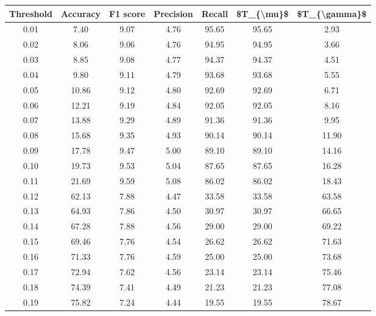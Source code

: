 \begin{tabular}{|c|c|c|c|c|c|c|}
\toprule
 Threshold &  Accuracy &  F1 score &  Precision &  Recall &  \$T\_\{\textbackslash mu\}\$ &  \$T\_\{\textbackslash gamma\}\$ \\
\hline
      0.01 &      7.40 &      9.07 &       4.76 &   95.65 &      95.65 &          2.93 \\
      0.02 &      8.06 &      9.06 &       4.76 &   94.95 &      94.95 &          3.66 \\
      0.03 &      8.85 &      9.08 &       4.77 &   94.37 &      94.37 &          4.51 \\
      0.04 &      9.80 &      9.11 &       4.79 &   93.68 &      93.68 &          5.55 \\
      0.05 &     10.86 &      9.12 &       4.80 &   92.69 &      92.69 &          6.71 \\
      0.06 &     12.21 &      9.19 &       4.84 &   92.05 &      92.05 &          8.16 \\
      0.07 &     13.88 &      9.29 &       4.89 &   91.36 &      91.36 &          9.95 \\
      0.08 &     15.68 &      9.35 &       4.93 &   90.14 &      90.14 &         11.90 \\
      0.09 &     17.78 &      9.47 &       5.00 &   89.10 &      89.10 &         14.16 \\
      0.10 &     19.73 &      9.53 &       5.04 &   87.65 &      87.65 &         16.28 \\
      0.11 &     21.69 &      9.59 &       5.08 &   86.02 &      86.02 &         18.43 \\
      0.12 &     62.13 &      7.88 &       4.47 &   33.58 &      33.58 &         63.58 \\
      0.13 &     64.93 &      7.86 &       4.50 &   30.97 &      30.97 &         66.65 \\
      0.14 &     67.28 &      7.88 &       4.56 &   29.00 &      29.00 &         69.22 \\
      0.15 &     69.46 &      7.76 &       4.54 &   26.62 &      26.62 &         71.63 \\
      0.16 &     71.33 &      7.76 &       4.59 &   25.00 &      25.00 &         73.68 \\
      0.17 &     72.94 &      7.62 &       4.56 &   23.14 &      23.14 &         75.46 \\
      0.18 &     74.39 &      7.41 &       4.49 &   21.23 &      21.23 &         77.08 \\
      0.19 &     75.82 &      7.24 &       4.44 &   19.55 &      19.55 &         78.67 \\

\end{tabular}
